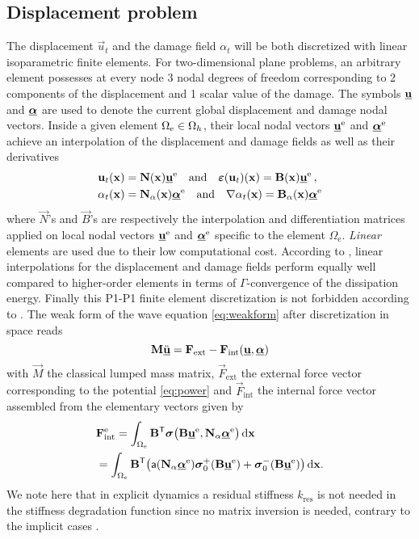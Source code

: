\subsection{Displacement problem}
The displacement $\vec{u}_t$ and the damage field $\alpha_t$ will be both discretized with linear isoparametric finite elements. For two-dimensional plane problems, an arbitrary element possesses at every node 3 nodal degrees of freedom corresponding to 2 components of the displacement and 1 scalar value of the damage. The symbols $\uvec$ and $\dvec$ are used to denote the current global displacement and damage nodal vectors. Inside a given element $\Omega_{\mathrm{e}}\in\Omega_h$, their local nodal vectors $\uvec^\me$ and $\dvec^\me$ achieve an interpolation of the displacement and damage fields as well as their derivatives
\begin{align*}
& \vec{u}_t(\vec{x})=\vec{N}(\vec{x})\uvec^\me\quad\text{and}\quad\eps(\vec{u}_t)(\vec{x})=\vec{B}(\vec{x})\uvec^\me\, , \\
& \alpha_t(\vec{x})=\vec{N}_\alpha(\vec{x})\dvec^\me\quad\text{and}\quad\nabla\alpha_t(\vec{x})=\vec{B}_\alpha(\vec{x})\dvec^\me
\end{align*}
where $\vec{N}$'s and $\vec{B}$'s are respectively the interpolation and differentiation matrices applied on local nodal vectors $\uvec^\me$ and $\dvec^\me$ specific to the element $\Omega_\mathrm{e}$. \emph{Linear} elements are used due to their low computational cost. According to \cite{BourdinFrancfortMarigo:2008}, linear interpolations for the displacement and damage fields perform equally well compared to higher-order elements in terms of $\Gamma$-convergence of the dissipation energy. Finally this P1-P1 finite element discretization is not forbidden according to \cite{SimoneAskesPeerlingsSluys:2003}. The weak form of the wave equation \eqref{eq:weakform} after discretization in space reads
\begin{equation} \label{eq:waveeqsdis}
\vec{M}\ddot{\uvec}=\vec{F}_\mathrm{ext}-\vec{F}_\mathrm{int}(\uvec,\dvec)
\end{equation}
with $\vec{M}$ the classical lumped mass matrix, $\vec{F}_\mathrm{ext}$ the external force vector corresponding to the potential \eqref{eq:power} and $\vec{F}_\mathrm{int}$ the internal force vector assembled from the elementary vectors given by
\begin{equation} \label{eq:Fint}
\begin{aligned}
& \vec{F}_\mathrm{int}^\me=\int_{\Omega_\me}\vec{B}^\mT\sig\bigl(\vec{B}\uvec^\me,\vec{N}_\alpha\dvec^\me\bigr)\dx \\
&= \int_{\Omega_\me}\vec{B}^\mT\bigl(\mathsf{a}(\vec{N}_\alpha\dvec^\me)\sig_0^+(\vec{B}\uvec^\me)+\sig_0^-(\vec{B}\uvec^\me)\bigr)\dx.
\end{aligned}
\end{equation}
We note here that in explicit dynamics a residual stiffness $k_\mathrm{res}$ is not needed in the stiffness degradation function since no matrix inversion is needed, contrary to the implicit cases \cite{PhamAmorMarigoMaurini:2011,SchlueterWillenbuecherKuhnMueller:2014}.

